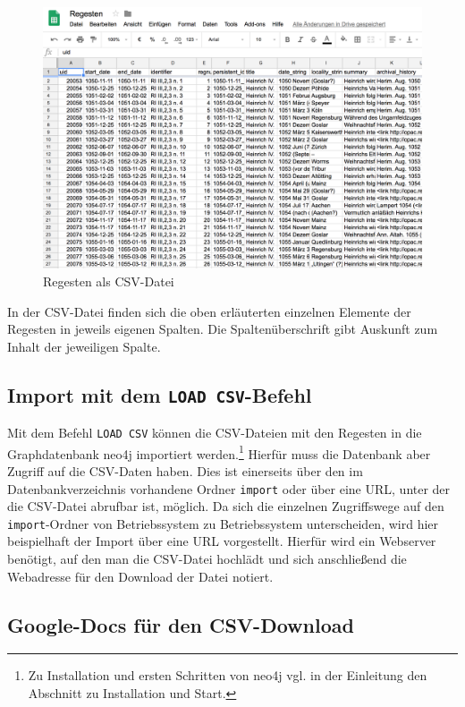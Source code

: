 \documentclass[ngerman,]{scrreprt}
\begin{document}
\begin{figure}
\centering
\includegraphics{Bilder/RI2Graph/ReggH4-Regestentabelle.png}
\caption{Regesten als CSV-Datei}
\end{figure}

In der CSV-Datei finden sich die oben erläuterten einzelnen Elemente der Regesten in jeweils eigenen Spalten. Die Spaltenüberschrift gibt Auskunft zum Inhalt der jeweiligen Spalte.

\hypertarget{import-mit-dem-load-csv-befehl}{%
\subsection{\texorpdfstring{Import mit dem \texttt{LOAD\ CSV}-Befehl}{Import mit dem LOAD CSV-Befehl}}\label{import-mit-dem-load-csv-befehl}}

Mit dem Befehl \texttt{LOAD\ CSV} können die CSV-Dateien mit den Regesten in die Graphdatenbank neo4j importiert werden.\footnote{Zu Installation und ersten Schritten von neo4j vgl. in der Einleitung den Abschnitt zu Installation und Start.} Hierfür muss die Datenbank aber Zugriff auf die CSV-Daten haben. Dies ist einerseits über den im Datenbankverzeichnis vorhandene Ordner \texttt{import} oder über eine URL, unter der die CSV-Datei abrufbar ist, möglich. Da sich die einzelnen Zugriffswege auf den \texttt{import}-Ordner von Betriebssystem zu Betriebssystem unterscheiden, wird hier beispielhaft der Import über eine URL vorgestellt. Hierfür wird ein Webserver benötigt, auf den man die CSV-Datei hochlädt und sich anschließend die Webadresse für den Download der Datei notiert.

\hypertarget{google-docs-fuxfcr-den-csv-download}{%
\subsection{Google-Docs für den CSV-Download}\label{google-docs-fuxfcr-den-csv-download}}
\end{document}
